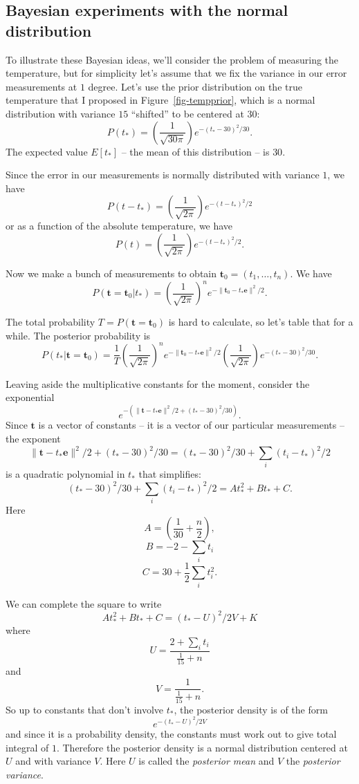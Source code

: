 \documentclass[
  11pt,
  letterpaper,
]{scrbook}
\theoremstyle{plain}
\theoremstyle{remark}
\begin{document}
\hypertarget{bayesian-experiments-with-the-normal-distribution}{%
\subsection{Bayesian experiments with the normal
distribution}\label{bayesian-experiments-with-the-normal-distribution}}

To illustrate these Bayesian ideas, we'll consider the problem of
measuring the temperature, but for simplicity let's assume that we fix
the variance in our error measurements at \(1\) degree. Let's use the
prior distribution on the true temperature that I proposed in
Figure~\ref{fig-tempprior}, which is a normal distribution with variance
\(15\) ``shifted'' to be centered at \(30\): \[
P(t_*)=\left(\frac{1}{\sqrt{30\pi}}\right)e^{-(t_*-30)^2/30}.
\] The expected value \(E[t_*]\) -- the mean of this distribution -- is
\(30\).

Since the error in our measurements is normally distributed with
variance \(1\), we have \[
P(t-t_{*})=\left(\frac{1}{\sqrt{2\pi}}\right)e^{-(t-t_{*})^2/2}
\] or as a function of the absolute temperature, we have \[
P(t) = \left(\frac{1}{\sqrt{2\pi}}\right)e^{-(t-t_*)^2/2}.
\]

Now we make a bunch of measurements to obtain
\(\mathbf{t}_0=(t_1,\ldots, t_n)\). We have \[
P(\mathbf{t}=\mathbf{t}_0|t_{*}) = \left(\frac{1}{\sqrt{2\pi}}\right)^n e^{-\|\mathbf{t}_0-t_*\mathbf{e}\|^2/2}.
\]

The total probability \(T=P(\mathbf{t}=\mathbf{t}_0)\) is hard to
calculate, so let's table that for a while. The posterior probability is
\[
P(t_{*}|\mathbf{t}=\mathbf{t}_{0}) = \frac{1}{T}
\left(\frac{1}{\sqrt{2\pi}}\right)^n e^{-\|\mathbf{t}_0-t_*\mathbf{e}\|^2/2}
\left(\frac{1}{\sqrt{2\pi}}\right)e^{-(t_*-30)^2/30}.
\]

Leaving aside the multiplicative constants for the moment, consider the
exponential \[
e^{-\left(\|\mathbf{t}-t_{*}\mathbf{e}\|^2/2+(t_{*}-30)^2/30\right)}.
\] Since \(\mathbf{t}\) is a vector of constants -- it is a vector of
our particular measurements -- the exponent \[
\|\mathbf{t}-t_{*}\mathbf{e}\|^2/2+(t_{*}-30)^2/30 = (t_{*}-30)^2/30+\sum_{i} (t_{i}-t_{*})^2/2
\] is a quadratic polynomial in \(t_{*}\) that simplifies: \[
(t_{*}-30)^2/30+\sum_{i} (t_{i}-t_{*})^2/2 = At_{*}^2+Bt_{*}+C.
\] Here \[
A=(\frac{1}{30}+\frac{n}{2}),
\] \[
B=-2-\sum_{i} t_{i}
\] \[
C=30+\frac{1}{2}\sum_{i} t_{i}^2.
\]

We can complete the square to write \[
At_{*}^2+Bt_{*}+C = (t_{*}-U)^2/2V +K
\] where \[
U=\frac{2+\sum_{i}t_{i}}{\frac{1}{15}+n}
\] and \[
V=\frac{1}{\frac{1}{15}+n}.
\] So up to constants that don't involve \(t_{*}\), the posterior
density is of the form \[
e^{-(t_{*}-U)^2/2V}
\] and since it is a probability density, the constants must work out to
give total integral of \(1\). Therefore the posterior density is a
normal distribution centered at \(U\) and with variance \(V\). Here
\(U\) is called the \emph{posterior mean} and \(V\) the \emph{posterior
variance}.
\end{document}
